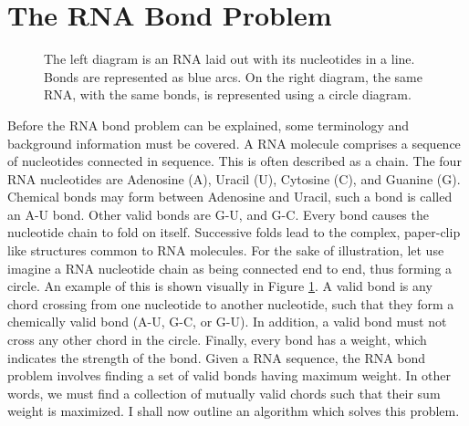 \documentclass[12pt, a4paper]{article}
\begin{document}
\section{The RNA Bond Problem}

\begin{figure}
\begin{center}
\end{center}
\caption{The left diagram is an RNA laid out with its nucleotides in a line. Bonds are represented as blue arcs. On the right diagram, the same RNA, with the same bonds, is represented using a circle diagram.}
\label{fig:line2circle}
\end{figure}

Before the RNA bond problem can be explained, some terminology and background information must be covered. A RNA molecule comprises a sequence of nucleotides connected in sequence. This is often described as a chain. The four RNA nucleotides are Adenosine (A), Uracil (U), Cytosine (C), and Guanine (G). Chemical bonds may form between Adenosine and Uracil, such a bond is called an A-U bond. Other valid bonds are G-U, and G-C. Every bond causes the nucleotide chain to fold on itself. Successive folds lead to the complex, paper-clip like structures common to RNA molecules. For the sake of illustration, let use imagine a RNA nucleotide chain as being connected end to end, thus forming a circle. An example of this is shown visually in Figure \ref{fig:line2circle}. A valid bond is any chord crossing from one nucleotide to  another nucleotide, such that they form a chemically valid bond (A-U, G-C, or G-U). In addition, a valid bond must not cross any other chord in the circle. Finally, every bond has a weight, which indicates the strength of the bond. Given a RNA sequence, the RNA bond problem involves finding a set of valid bonds having maximum weight. In other words, we must find a collection of mutually valid chords such that their sum weight is maximized. I shall now outline an algorithm which solves this problem.
\end{document}

